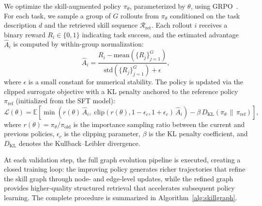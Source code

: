 We optimize the skill-augmented policy $\pi_\theta$, parameterized by $\theta$, using GRPO~\citep{shao2024deepseekmath}. For each task, we sample a group of $G$ rollouts from $\pi_\theta$ conditioned on the task description $d$ and the retrieved skill sequence $\mathcal{R}_{\text{ret}}$. Each rollout $i$ receives a binary reward $R_i \in \{0,1\}$ indicating task success, and the estimated advantage $\hat{A}_i$ is computed by within-group normalization:
\begin{equation}
    \hat{A}_i = \frac{R_i - \text{mean}(\{R_j\}_{j=1}^G)}{\text{std}(\{R_j\}_{j=1}^G) + \epsilon},
    \label{eq:advantage}
\end{equation}
where $\epsilon$ is a small constant for numerical stability. The policy is updated via the clipped surrogate objective with a KL penalty anchored to the reference policy $\pi_{\text{ref}}$ (initialized from the SFT model):
\begin{equation}
    \mathcal{L}(\theta) = \mathbb{E}\!\left[\min\!\left(r(\theta)\,\hat{A}_i,\; \text{clip}(r(\theta), 1\!-\!\epsilon_c, 1\!+\!\epsilon_c)\,\hat{A}_i\right) - \beta\, D_{\text{KL}}\!\left(\pi_\theta \,\|\, \pi_{\text{ref}}\right)\right],
    \label{eq:grpo}
\end{equation}
where $r(\theta) = \pi_\theta / \pi_{\text{old}}$ is the importance sampling ratio between the current and previous policies, $\epsilon_c$ is the clipping parameter, $\beta$ is the KL penalty coefficient, and $D_{\text{KL}}$ denotes the Kullback--Leibler divergence.

At each validation step, the full graph evolution pipeline is executed, creating a closed training loop: the improving policy generates richer trajectories that refine the skill graph through node- and edge-level updates, while the refined graph provides higher-quality structured retrieval that accelerates subsequent policy learning. The complete procedure is summarized in Algorithm~\ref{alg:skillgraph}.

